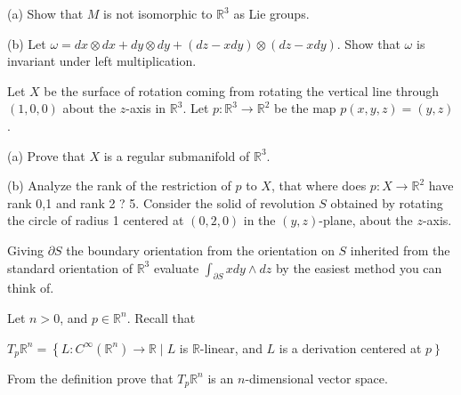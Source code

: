 \documentclass[10pt]{article}
\begin{document}
(a) Show that $M$ is not isomorphic to $\mathbb{R}^{3}$ as Lie groups.

(b) Let $\omega=d x \otimes d x+d y \otimes d y+(d z-x d y) \otimes(d z-x d y)$. Show that $\omega$ is invariant under left multiplication.

\newpage
Let $X$ be the surface of rotation coming from rotating the vertical line through $(1,0,0)$ about the $z$-axis in $\mathbb{R}^{3}$. Let $p: \mathbb{R}^{3} \rightarrow \mathbb{R}^{2}$ be the map $p(x, y, z)=(y, z)$.

(a) Prove that $X$ is a regular submanifold of $\mathbb{R}^{3}$.

(b) Analyze the rank of the restriction of $p$ to $X$, that where does $p: X \rightarrow \mathbb{R}^{2}$ have rank 0,1 and rank 2 ? 5. Consider the solid of revolution $S$ obtained by rotating the circle of radius 1 centered at $(0,2,0)$ in the $(y, z)$-plane, about the $z$-axis.

Giving $\partial S$ the boundary orientation from the orientation on $S$ inherited from the standard orientation of $\mathbb{R}^{3}$ evaluate $\int_{\partial S} x d y \wedge d z$ by the easiest method you can think of.

\newpage
Let $n>0$, and $p \in \mathbb{R}^{n}$. Recall that

$T_{p} \mathbb{R}^{n}=\left\{L: C^{\infty}\left(\mathbb{R}^{n}\right) \rightarrow \mathbb{R} \mid L\right.$ is $\mathbb{R}$-linear, and $L$ is a derivation centered at $\left.p\right\}$

From the definition prove that $T_{p} \mathbb{R}^{n}$ is an $n$-dimensional vector space.
\end{document}
